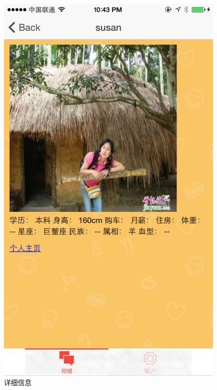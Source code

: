 \begin{figure}[h]
\begin{minipage}[t]{0.3\linewidth}
\includegraphics[width=\textwidth]{img/chap4/info2.jpg}
\caption{详细信息\label{instagram}}
\end{minipage}
\hfill
\begin{minipage}[t]{0.3\linewidth}
\centering

\end{minipage}
\end{figure}
